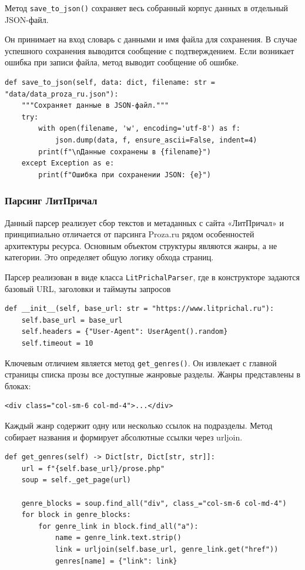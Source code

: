 \documentclass[coursework]{SCWorks}
\begin{document}
    Метод \texttt{save\_to\_json()} сохраняет весь собранный корпус данных в отдельный JSON-файл.

    Он принимает на вход словарь с данными и имя файла для сохранения.
    В случае успешного сохранения выводится сообщение с подтверждением.
    Если возникает ошибка при записи файла, метод выводит сообщение об ошибке.

    \begin{verbatim}
def save_to_json(self, data: dict, filename: str = "data/data_proza_ru.json"):
    """Сохраняет данные в JSON-файл."""
    try:
        with open(filename, 'w', encoding='utf-8') as f:
            json.dump(data, f, ensure_ascii=False, indent=4)
        print(f"\nДанные сохранены в {filename}")
    except Exception as e:
        print(f"Ошибка при сохранении JSON: {e}")
    \end{verbatim}

    \subsubsection{Парсинг ЛитПричал}


    Данный парсер реализует сбор текстов и метаданных с сайта «ЛитПричал» и принципиально отличается от парсинга Proza.ru
    рядом особенностей архитектуры ресурса.
    Основным объектом структуры являются жанры, а не категории.
    Это определяет общую логику обхода страниц.

    Парсер реализован в виде класса \texttt{LitPrichalParser}, где в конструкторе задаются базовый URL, заголовки и таймауты запросов
    \begin{verbatim}
def __init__(self, base_url: str = "https://www.litprichal.ru"):
    self.base_url = base_url
    self.headers = {"User-Agent": UserAgent().random}
    self.timeout = 10
    \end{verbatim}

    Ключевым отличием является метод \texttt{get\_genres()}.
    Он извлекает с главной страницы списка прозы все доступные жанровые разделы.
    Жанры представлены в блоках:

    \begin{verbatim}
<div class="col-sm-6 col-md-4">...</div>
    \end{verbatim}

    Каждый жанр содержит одну или несколько ссылок на подразделы.
    Метод собирает названия и формирует абсолютные ссылки через urljoin.

    \begin{verbatim}
def get_genres(self) -> Dict[str, Dict[str, str]]:
    url = f"{self.base_url}/prose.php"
    soup = self._get_page(url)

    genre_blocks = soup.find_all("div", class_="col-sm-6 col-md-4")
    for block in genre_blocks:
        for genre_link in block.find_all("a"):
            name = genre_link.text.strip()
            link = urljoin(self.base_url, genre_link.get("href"))
            genres[name] = {"link": link}
    \end{verbatim}
\end{document}
